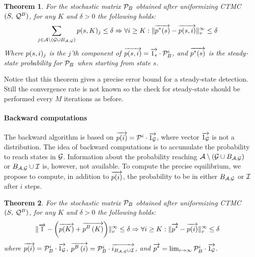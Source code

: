 \documentclass[times, 10pt,twocolumn]{article}
\newtheorem{theorem}{Theorem}
\begin{document}
	\begin{theorem}
		For the stochastic matrix $\mathcal{P}_{B}$ obtained after uniformizing CTMC $(S,\:\mathcal{Q}^{B})$, for any $K$ and $\delta > 0$ the following holds:
			{\small
			\[
				\sum_{j \in \mathcal{A} \setminus \left( \mathcal{G} \cup B_{ \mathcal{A}, \mathcal{G} } \right)} p(s,K)_{j} \leq \delta \Rightarrow \forall i \geq K : \lVert  \overrightarrow{p^{*}(s)} - \overrightarrow{p(s,i)}  \rVert_{v}^{\infty} \leq \delta
			 \]
			 }
		Where $p(s,i)_{j}$ is the $j$'th component of $\overrightarrow{p(s,i)} = \overrightarrow{1_{s} } \cdot \mathcal{P}_{B}^{i} $, and $\overrightarrow{p^{*}(s)}$ is the steady-state probability for $\mathcal{P}_{B}$ when starting from state $s$. \label{th:criteria_1}
	 \end{theorem}
	
	Notice that this theorem gives a precise error bound for a steady-state detection. Still the convergence rate is not known so the check for steady-state should be performed every $M$ iterations as before.
	
	\paragraph{Backward computations}	 
	The backward algorithm is based on $\overrightarrow{p(i)} = \mathcal{P}^{i} \cdot \overrightarrow{1_{\mathcal{G}}}$, where vector $\overrightarrow{1_{\mathcal{G}}}$ is not a distribution. The idea of backward computations is to accumulate the probability to reach states in $\mathcal{G}$. Information about the probability reaching $\mathcal{A} \setminus \left( \mathcal{G} \cup B_{ \mathcal{A}, \mathcal{G} } \right)$ or $B_{ \mathcal{A}, \mathcal{G} } \cup \mathcal{I}$ is, however, not available. To compute the precise equilibrium, we propose to compute, in addition to $\overrightarrow{p(i)}$, the probability to be in either $B_{ \mathcal{A}, \mathcal{G} }$ or $\mathcal{I}$ after $i$ steps.
	
	\begin{theorem}
		For the stochastic matrix $\mathcal{P}_{B}$ obtained after uniformizing CTMC $(S,\:\mathcal{Q}^{B})$, for any $K$ and $\delta > 0$ the following holds:
			{\small
			\[
				\lVert   \overrightarrow{1} - \left( \overrightarrow{p(K)} + \overrightarrow{p^{B}\left( K \right)} \right)   \rVert_{v}^{\infty} \leq \delta \Rightarrow \forall i \geq K : \lVert  \overrightarrow{p^{*}} - \overrightarrow{p(i)}  \rVert_{v}^{\infty} \leq \delta
			 \]
			 }
		where $\overrightarrow{p(i)} = \mathcal{P}_{B}^{i} \cdot \overrightarrow{1_{\mathcal{G}}}$, $\overrightarrow{p^{B}\left( i \right)} = \mathcal{P}_{B}^{i} \cdot \overrightarrow {i_{B_{ \mathcal{A}, \mathcal{G} } \cup \mathcal{I}}}$, and $\overrightarrow{p^{*}} = \lim_{i \rightarrow \infty} \mathcal{P}_{B}^{i} \cdot \overrightarrow{1_{\mathcal{G}}}$. \label{th:criteria_2}
	\end{theorem}

{}
\end{document}
